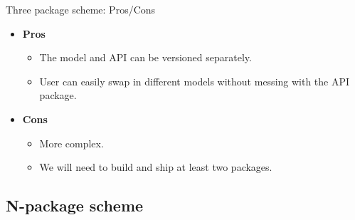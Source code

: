 \documentclass[10pt]{beamer}
\begin{document}







\begin{frame}[fragile]{Three package scheme: Pros/Cons}

  \begin{itemize}
    \item \textbf{Pros}
      \begin{itemize}
        \item The model and API can be versioned separately.
        \item User can easily swap in different models without messing with the API package.
      \end{itemize}

    \item \textbf{Cons}
      \begin{itemize}
        \item More complex.
        \item We will need to build and ship at least two packages.
      \end{itemize}
  \end{itemize}

\end{frame}



\subsection{N-package scheme}
\end{document}
